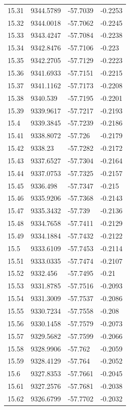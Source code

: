 \begin{table}[H]
\begin{tabular}{llll}
15.31 & 9344.5789 & -57.7039 & -0.2253 \\
15.32 & 9344.0018 & -57.7062 & -0.2245 \\
15.33 & 9343.4247 & -57.7084 & -0.2238 \\
15.34 & 9342.8476 & -57.7106 & -0.223 \\
15.35 & 9342.2705 & -57.7129 & -0.2223 \\
15.36 & 9341.6933 & -57.7151 & -0.2215 \\
15.37 & 9341.1162 & -57.7173 & -0.2208 \\
15.38 & 9340.539 & -57.7195 & -0.2201 \\
15.39 & 9339.9617 & -57.7217 & -0.2193 \\
15.4 & 9339.3845 & -57.7239 & -0.2186 \\
15.41 & 9338.8072 & -57.726 & -0.2179 \\
15.42 & 9338.23 & -57.7282 & -0.2172 \\
15.43 & 9337.6527 & -57.7304 & -0.2164 \\
15.44 & 9337.0753 & -57.7325 & -0.2157 \\
15.45 & 9336.498 & -57.7347 & -0.215 \\
15.46 & 9335.9206 & -57.7368 & -0.2143 \\
15.47 & 9335.3432 & -57.739 & -0.2136 \\
15.48 & 9334.7658 & -57.7411 & -0.2129 \\
15.49 & 9334.1884 & -57.7432 & -0.2122 \\
15.5 & 9333.6109 & -57.7453 & -0.2114 \\
15.51 & 9333.0335 & -57.7474 & -0.2107 \\
15.52 & 9332.456 & -57.7495 & -0.21 \\
15.53 & 9331.8785 & -57.7516 & -0.2093 \\
15.54 & 9331.3009 & -57.7537 & -0.2086 \\
15.55 & 9330.7234 & -57.7558 & -0.208 \\
15.56 & 9330.1458 & -57.7579 & -0.2073 \\
15.57 & 9329.5682 & -57.7599 & -0.2066 \\
15.58 & 9328.9906 & -57.762 & -0.2059 \\
15.59 & 9328.4129 & -57.764 & -0.2052 \\
15.6 & 9327.8353 & -57.7661 & -0.2045 \\
15.61 & 9327.2576 & -57.7681 & -0.2038 \\
15.62 & 9326.6799 & -57.7702 & -0.2032 \\

\end{tabular}
\end{table}
